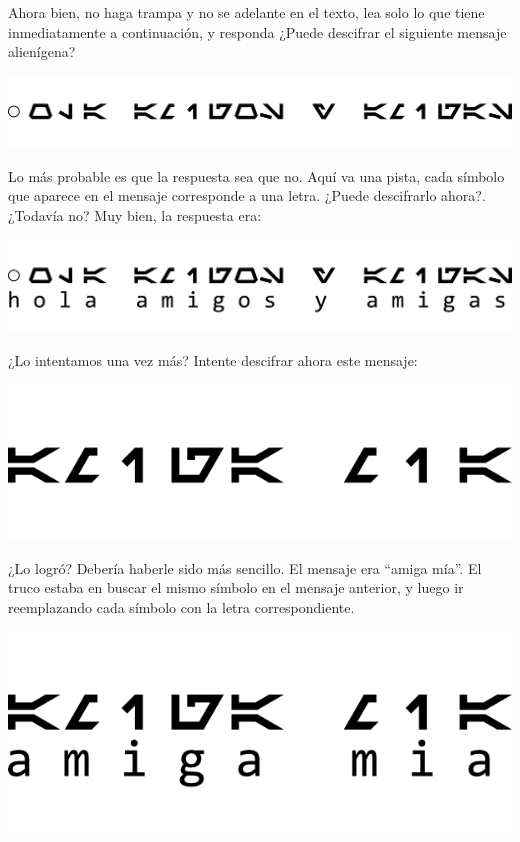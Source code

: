 Ahora bien, no haga trampa y no se adelante en el texto, lea solo lo que tiene
inmediatamente a continuación, y responda ¿Puede descifrar el siguiente mensaje
alienígena?

\centerline{\includegraphics[]{unidades/2_informacion/1_bajo_nivel/imagenes/secret_message_A1.png}}

Lo más probable es que la respuesta sea que no. Aquí va una pista, cada símbolo
que aparece en el mensaje corresponde a una letra. ¿Puede descifrarlo ahora?.
¿Todavía no? Muy bien, la respuesta era:

\centerline{\includegraphics[]{unidades/2_informacion/1_bajo_nivel/imagenes/secret_message_A2.png}}

¿Lo intentamos una vez más? Intente descifrar ahora este mensaje:

\centerline{\includegraphics[]{unidades/2_informacion/1_bajo_nivel/imagenes/secret_message_B1.png}}

¿Lo logró? Debería haberle sido más sencillo. El mensaje era ``amiga mía''. El
truco estaba en buscar el mismo símbolo en el mensaje anterior, y luego ir
reemplazando cada símbolo con la letra correspondiente.

\centerline{\includegraphics[]{unidades/2_informacion/1_bajo_nivel/imagenes/secret_message_B2.png}}


